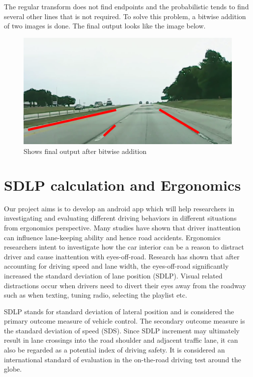 The regular transform does not find endpoints and the probabilistic tends to find several other lines that is not required. To solve this problem, a bitwise addition of two images is done. The final output looks like the image below.

\begin{figure}
\begin{center}
    \includegraphics[scale=0.6]{img/lane9.png}
\end{center}
\caption{Shows final output after bitwise addition}
\label{fig:lane9}
\end{figure}

\section{SDLP calculation and Ergonomics}

Our project aims is to develop an android app which will help researchers in investigating and evaluating different driving behaviors in different situations from ergonomics perspective. Many studies have shown that driver inattention can influence lane-keeping ability and hence road accidents. Ergonomics researchers intent to investigate how the car interior can be a reason to distract driver and cause inattention with eyes-off-road. Research has shown that after accounting for driving speed and lane width, the eyes-off-road significantly increased the standard deviation of lane position (SDLP). Visual related distractions occur when drivers need to divert their eyes away from the roadway such as when texting, tuning radio, selecting the playlist etc. 

SDLP stands for standard deviation of lateral position and is considered the primary outcome measure of vehicle control. The secondary outcome measure is the standard deviation of speed (SDS). Since SDLP increment may ultimately result in lane crossings into the road shoulder and adjacent traffic lane, it can also be regarded as a potential index of driving safety. It is considered an international standard of evaluation in the on-the-road driving test around the globe. 


